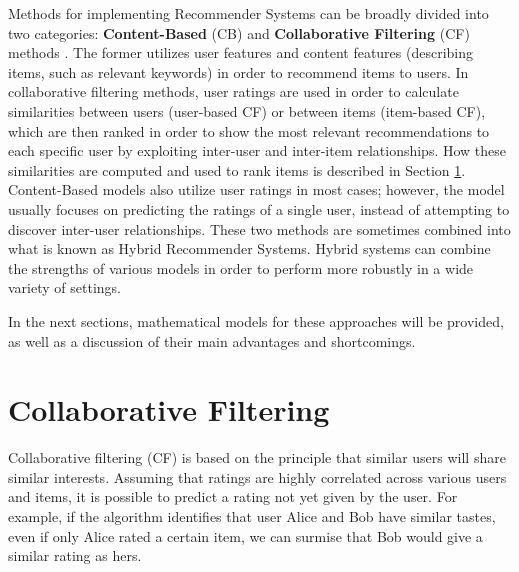 \documentclass[cic,tc,english]{iiufrgs}
\begin{document}
Methods for implementing Recommender Systems can be broadly divided into two categories: \textbf{Content-Based} (CB) and \textbf{Collaborative Filtering} (CF) methods \cite{Rakesh2016}.
The former utilizes user features and content features (describing items, such as relevant keywords) in order to recommend items to users. In collaborative filtering methods, user ratings are used in order to calculate similarities between users (user-based CF) or between items (item-based CF), which are then ranked in order to show the most relevant recommendations to each specific user by exploiting inter-user and inter-item relationships. How these similarities are computed and used to rank items is described in Section \ref{cf}. Content-Based models also utilize user ratings in most cases; however, the model usually focuses on predicting the ratings of a single user, instead of attempting to discover inter-user relationships. These two methods are sometimes combined into what is known as Hybrid Recommender Systems. Hybrid systems can combine the strengths of various models in order to perform more robustly in a wide variety of settings.

In the next sections, mathematical models for these approaches will be provided, as well as a discussion of their main advantages and shortcomings.

\section{Collaborative Filtering} \label{cf}
Collaborative filtering (CF) is based on the principle that similar users will share similar interests. Assuming that ratings are highly correlated across various users and items, it is possible to predict a rating not yet given by the user. For example, if the algorithm identifies that user Alice and Bob have similar tastes, even if only Alice rated a certain item, we can surmise that Bob would give a similar rating as hers. 
\end{document}
